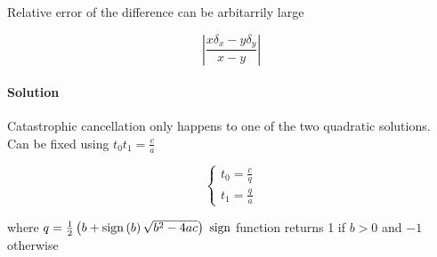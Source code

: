     Relative error of the difference can be arbitarrily large

    \begin{equation}
      \left| \frac{x \delta_{x} - y \delta_{y}}{x - y} \right|
    \end{equation}

    \paragraph{Solution} Catastrophic cancellation only happens to one of the
    two quadratic solutions. Can be fixed using $ t_{0} t_{1} = \frac{c}{a} $

    \begin{equation}
      \begin{cases}
        t_{0} = \frac{c}{q} \\
        t_{1} = \frac{q}{a}
      \end{cases}
    \end{equation}

    where $ q = \frac{1}{2}\left( b + \operatorname{sign}\left( b \right) \sqrt{b^{2} - 4ac} \right) $
    $ \operatorname{sign} $ function returns 1 if $ b > 0 $ and $ - 1 $ otherwise
